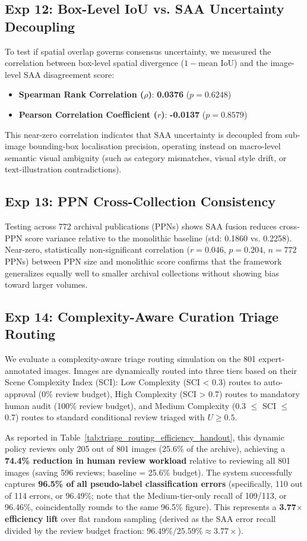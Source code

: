 \documentclass[11pt,a4paper]{article}
\newcommand{\term}[1]{\textbf{#1}}
\begin{document}
\subsection{Exp 12: Box-Level IoU vs. SAA Uncertainty Decoupling}\label{sec:box_iou_decoupling}
To test if spatial overlap governs consensus uncertainty, we measured the correlation between box-level spatial divergence ($1 - \text{mean IoU}$) and the image-level SAA disagreement score:
\begin{itemize}[noitemsep]
    \item \term{Spearman Rank Correlation ($\rho$)}: \textbf{0.0376} ($p = 0.6248$)
    \item \term{Pearson Correlation Coefficient ($r$)}: \textbf{-0.0137} ($p = 0.8579$)
\end{itemize}
This near-zero correlation indicates that SAA uncertainty is decoupled from sub-image bounding-box localisation precision, operating instead on macro-level semantic visual ambiguity (such as category mismatches, visual style drift, or text-illustration contradictions).

\subsection{Exp 13: PPN Cross-Collection Consistency}\label{sec:ppn_consistency}
Testing across 772 archival publications (PPNs) shows SAA fusion reduces cross-PPN score variance relative to the monolithic baseline (std: 0.1860 vs. 0.2258). Near-zero, statistically non-significant correlation ($r=0.046$, $p=0.204$, $n=772$ PPNs) between PPN size and monolithic score confirms that the framework generalizes equally well to smaller archival collections without showing bias toward larger volumes.

\subsection{Exp 14: Complexity-Aware Curation Triage Routing}
\label{sec:triage_routing}
We evaluate a complexity-aware triage routing simulation on the 801 expert-annotated images. Images are dynamically routed into three tiers based on their Scene Complexity Index (SCI): Low Complexity (SCI < 0.3) routes to auto-approval (0\% review budget), High Complexity (SCI > 0.7) routes to mandatory human audit (100\% review budget), and Medium Complexity (0.3 $\le$ SCI $\le$ 0.7) routes to standard conditional review triaged with $U \ge 0.5$.

As reported in Table~\ref{tab:triage_routing_efficiency_handout}, this dynamic policy reviews only 205 out of 801 images (25.6\% of the archive), achieving a \textbf{74.4\% reduction in human review workload} relative to reviewing all 801 images (saving 596 reviews; baseline = 25.6\% budget). The system successfully captures \textbf{96.5\% of all pseudo-label classification errors} (specifically, 110 out of 114 errors, or 96.49\%; note that the Medium-tier-only recall of 109/113, or 96.46\%, coincidentally rounds to the same 96.5\% figure). This represents a \textbf{3.77$\times$ efficiency lift} over flat random sampling (derived as the SAA error recall divided by the review budget fraction: $96.49\% / 25.59\% \approx 3.77\times$).
\end{document}
